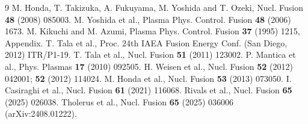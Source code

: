 \documentclass[11pt]{article}
\begin{document}
\begin{thebibliography}{9}
 M. Honda, T. Takizuka, A. Fukuyama, M. Yoshida and T. Ozeki,
  Nucl. Fusion \textbf{48} (2008) 085003.
 M. Yoshida et al., Plasma Phys. Control. Fusion \textbf{48} (2006) 1673.
 M. Kikuchi and M. Azumi, Plasma Phys. Control. Fusion \textbf{37} (1995) 1215,
  Appendix.
 T. Tala et al., Proc. 24th IAEA Fusion Energy Conf. (San Diego, 2012) ITR/P1-19.
 T. Tala et al., Nucl. Fusion \textbf{51} (2011) 123002.
 P. Mantica et al., Phys. Plasmas \textbf{17} (2010) 092505.
 H. Weisen et al., Nucl. Fusion \textbf{52} (2012) 042001; \textbf{52} (2012) 114024.
 M. Honda et al., Nucl. Fusion \textbf{53} (2013) 073050.
 I. Casiraghi et al., Nucl. Fusion \textbf{61} (2021) 116068.
 Rivals et al., Nucl. Fusion \textbf{65} (2025) 026038.
 Tholerus et al., Nucl. Fusion \textbf{65} (2025) 036006 (arXiv:2408.01222).
\end{thebibliography}
\end{document}
